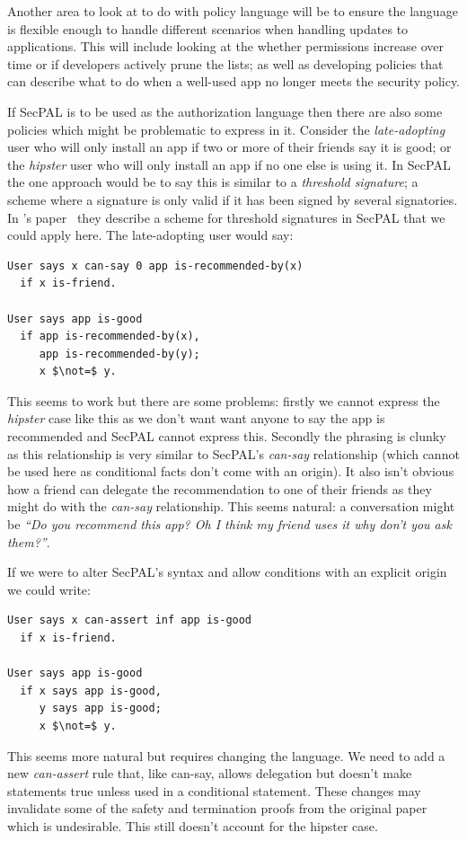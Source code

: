 \documentclass[a4paper,sfsidenotes]{%
  article%
}
\begin{document}
Another area to look at to do with policy language will be to ensure the language
is flexible enough to handle different scenarios when handling updates to
applications.  This will include looking at the whether permissions increase
over time or if developers actively prune the lists; as well as developing
policies that can describe what to do when a well-used app no longer meets the
security policy.  

\label{secpal:problems}

If SecPAL is to be used as the authorization language then there are also some
policies which might be problematic to express in it.  Consider the
\emph{late-adopting} user who will only install an app if two or more of their
friends say it is good; or the \emph{hipster} user who will only install an app
if no one else is using it. In SecPAL the one approach would be to say this is
similar to a \emph{threshold signature}; a scheme where a signature is only
valid if it has been signed by several signatories.  In
\citeauthor*{Becker:2006vh}'s paper~\cite{Becker:2006vh} they describe a scheme
for threshold signatures in SecPAL that we could apply here.  The late-adopting user would
say: 

\begin{lstlisting}[language=SecPAL, mathescape=true] 
User says x can-say 0 app is-recommended-by(x)
  if x is-friend.

User says app is-good
  if app is-recommended-by(x),
     app is-recommended-by(y);
     x $\not=$ y.
\end{lstlisting}
This seems to work but there are some problems: firstly we cannot express the
\emph{hipster} case like this as we don't want want anyone to say the app is
recommended and SecPAL cannot express this.  Secondly the phrasing is clunky as
this relationship is very similar to SecPAL's \emph{can-say} relationship (which
cannot be used here as conditional facts don't come with an origin).  It also
isn't obvious how a friend can delegate the recommendation to one of their
friends as they might do with the \emph{can-say} relationship. This seems
natural: a conversation might be \emph{``Do you recommend this app? Oh I think
my friend uses it why don't you ask them?''}.  

If we were to alter SecPAL's syntax and allow conditions with an explicit origin
we could write:
\begin{lstlisting}[language=SecPAL, mathescape=true]
User says x can-assert inf app is-good
  if x is-friend.

User says app is-good
  if x says app is-good,
     y says app is-good;
     x $\not=$ y.
\end{lstlisting}
This seems more natural but requires changing the language. We need to add a new
\emph{can-assert} rule that, like can-say, allows delegation but doesn't make
statements true unless used in a conditional statement.  These changes may
invalidate some of the safety and termination proofs from the original
paper~\cite{Becker:2006vh} which is undesirable.  This still doesn't account for
the hipster case. 
\end{document}
